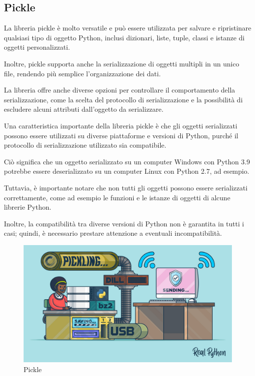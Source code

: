 \subsection{Pickle}
La libreria pickle è molto versatile e può essere utilizzata per salvare e ripristinare qualsiasi tipo di oggetto Python, inclusi dizionari, liste, tuple, classi e istanze di oggetti personalizzati. 

Inoltre, pickle supporta anche la serializzazione di oggetti multipli in un unico file, rendendo più semplice l'organizzazione dei dati. 

La libreria offre anche diverse opzioni per controllare il comportamento della serializzazione, come la scelta del protocollo di serializzazione e la possibilità di escludere alcuni attributi dall'oggetto da serializzare.

Una caratteristica importante della libreria pickle è che gli oggetti serializzati possono essere utilizzati su diverse piattaforme e versioni di Python, purché il protocollo di serializzazione utilizzato sia compatibile. 

Ciò significa che un oggetto serializzato su un computer Windows con Python 3.9 potrebbe essere deserializzato su un computer Linux con Python 2.7, ad esempio. 

Tuttavia, è importante notare che non tutti gli oggetti possono essere serializzati correttamente, come ad esempio le funzioni e le istanze di oggetti di alcune librerie Python. 

Inoltre, la compatibilità tra diverse versioni di Python non è garantita in tutti i casi; quindi, è necessario prestare attenzione a eventuali incompatibilità.

\begin{figure}
    \begin{center}    
        \includegraphics[width=1\linewidth]{images/image6.jpeg}
        \caption{Pickle}
    \end{center}
\end{figure}

